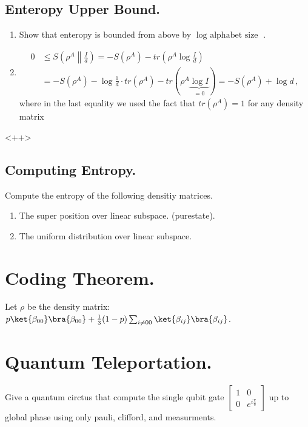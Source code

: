 \documentclass[12pt,a4paper]{article}
\begin{document}
\subsection{Enteropy Upper Bound. } 
\begin{enumerate}
  \item Show that enteropy is bounded from above by $\log \text{ alphabet size } $. 
  \item   \begin{align*}
        0 &\leq S \left( \rho^A \middle\| \frac{I}{d} \right) = - S(\rho^A) - tr \left( \rho^A \log \frac{I}{d} \right) \\
        &= -S(\rho^A) - \log\frac{1}{d} \cdot tr(\rho^A) - tr(\rho^A \underbrace{\log I}_{=0})
        = -S(\rho^A) + \log d \,,
    \end{align*}
    where in the last equality we used the fact that $tr(\rho^A) = 1$ for any density matrix
\end{enumerate}<++>


\subsection{Computing Entropy.}

Compute the entropy of the following densitiy matrices. 
\begin{enumerate}
  \item The super position over linear subspace. (purestate). 
  \item The uniform distribution over linear subspace.
   
\end{enumerate}


\section{Coding Theorem.} 
Let $\rho$ be the density matrix: $p \ket{\beta_{00}}\bra{\beta_{00}} + \frac{1}{3}(1-p)\sum_{i \neq 00}{\ket{\beta_{ij}}\bra{\beta_{ij}}}$.
\section{Quantum Teleportation.}
Give a quantum circtus that compute the single qubit gate $\begin{bmatrix} 1 & 0 \\ 0 &  e^{i\frac{\pi}{8}} \end{bmatrix} $ up to global phase using only pauli, clifford, and measurments. 

\printbibliography 
\end{document}
